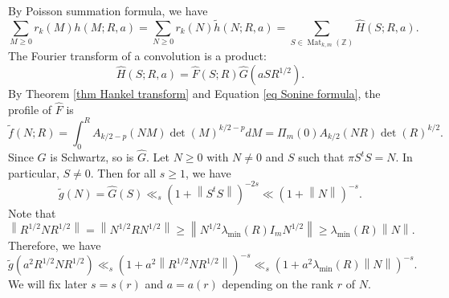 \documentclass[oneside]{amsart}
\numberwithin{equation}{section}
\theoremstyle{definition}
\theoremstyle{remark}
\theoremstyle{remark}
\newcommand{\ZZ}{\mathbb Z}
\newcommand{\norm}[1]{\left\lVert #1\right\rVert}		%
\DeclareMathOperator{\Mat}{Mat}
\begin{document}
By Poisson summation formula, we have
$$\sum_{M\geq0}r_k(M)h(M;R,a)=\sum_{N\geq0}r_k(N)\tilde h(N;R,a)=\sum_{S\in\Mat_{k,m}(\ZZ)}\hat H(S;R,a).$$
The Fourier transform of a convolution is a product:
$$\hat H(S;R,a)=\hat F(S;R)\hat G(aSR^{1/2}).$$
By Theorem \ref{thm Hankel transform} and Equation \eqref{eq Sonine formula}, the profile of $\hat F$ is
$$\tilde f(N;R)=\int_0^RA_{k/2-p}(NM)\det(M)^{k/2-p}dM=\Pi_m(0)A_{k/2}(NR)\det(R)^{k/2}.$$
Since $G$ is Schwartz, so is $\hat G$. Let $N\geq0$ with $N\neq0$ and $S$ such that $\pi S^tS=N$. In particular, $S\neq0$. Then for all $s\geq1$, we have
$$\tilde g(N)=\hat G(S)\ll_s(1+\norm{S^tS})^{-2s}\ll(1+\norm N)^{-s}.$$
Note that
$$\norm{R^{1/2}NR^{1/2}}=\norm{N^{1/2}RN^{1/2}}\geq\norm{N^{1/2}\lambda_{\min}(R)I_mN^{1/2}}\geq\lambda_{\min}(R)\norm N.$$
Therefore, we have
$$\tilde g(a^2R^{1/2}NR^{1/2})\ll_s\left(1+a^2\norm{R^{1/2}NR^{1/2}}\right)^{-s}\ll_s\left(1+a^2\lambda_{\min}(R)\norm N\right)^{-s}.$$
We will fix later $s=s(r)$ and $a=a(r)$ depending on the rank $r$ of $N$.
\end{document}
